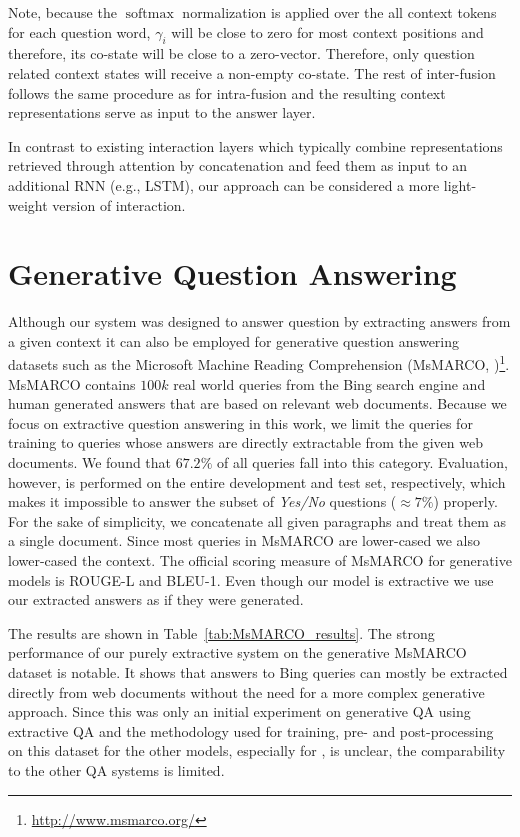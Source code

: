 \documentclass[11pt,a4paper]{article}
\begin{document}
Note, because the $\operatorname{softmax}$ normalization is applied over the all context tokens for each question word, $\gamma_i$ will be close to zero for most context positions and therefore, its co-state will be close to a zero-vector. Therefore, only question related context states will receive a non-empty co-state. The rest of inter-fusion follows the same procedure as for intra-fusion and the resulting context representations serve as input to the answer layer.

In contrast to existing interaction layers which typically combine representations retrieved through attention by concatenation and feed them as input to an additional RNN (e.g., LSTM), our approach can be considered a more light-weight version of interaction. 


\section{Generative Question Answering}

Although our system was designed to answer question by extracting answers from a given context it can also be employed for generative question answering datasets such as the Microsoft Machine Reading Comprehension (MsMARCO, )\footnote{\url{http://www.msmarco.org/}}. MsMARCO contains $100k$ real world queries from the Bing search engine and human generated answers that are based on relevant web documents. Because we focus on extractive question answering in this work, we limit the queries for training to queries whose answers are directly extractable from the given web documents. We found that $67.2\%$ of all queries fall into this category. Evaluation, however, is performed on the entire development and test set, respectively, which makes it impossible to answer the subset of \textit{Yes/No} questions ($\approx7\%$) properly. For the sake of simplicity, we concatenate all given paragraphs and treat them as a single document. Since most queries in MsMARCO are lower-cased we also lower-cased the context. The official scoring measure of MsMARCO for generative models is ROUGE-L and BLEU-1. Even though our model is extractive we use our extracted answers as if they were generated.

The results are shown in Table~\ref{tab:MsMARCO_results}. The strong performance of our purely extractive system on the generative MsMARCO dataset is notable. It shows that answers to Bing queries can mostly be extracted directly from web documents without the need for a more complex generative approach. Since this was only an initial experiment on generative QA using extractive QA and the methodology used for training, pre- and post-processing on this dataset for the other models, especially for , is unclear, the comparability to the other QA systems is limited.
\end{document}
